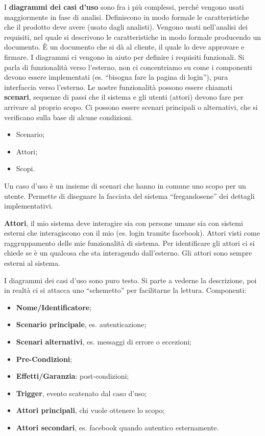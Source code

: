 I \textbf{diagrammi dei casi d'uso} sono fra i più complessi, perché vengono usati maggiormente in fase di analisi. Definiscono in modo formale le caratteristiche che il prodotto deve avere (usato dagli analisti). Vengono usati nell'analisi dei requisiti, nel quale si descrivono le caratteristiche in modo formale producendo un documento. È un documento che si dà al cliente, il quale lo deve approvare e firmare. I diagrammi ci vengono in aiuto per definire i requisiti funzionali. Si parla di funzionalità verso l'esterno, non ci concentriamo su come i componenti devono essere implementati (es. ``bisogna fare la pagina di login''), pura interfaccia verso l'esterno. Le nostre funzionalità possono essere chiamati \textbf{scenari}, sequenze di passi che il sistema e gli utenti (attori) devono fare per arrivare al proprio scopo. Ci possono essere scenari principali o alternativi, che si verificano sulla base di alcune condizioni.

\begin{itemize}
\item Scenario;
\item Attori;
\item Scopi.
\end{itemize}

Un caso d'uso è un insieme di scenari che hanno in comune uno scopo per un utente. Permette di disegnare la facciata del sistema ``fregandosene'' dei dettagli implementativi. 

\textbf{Attori}, il mio sistema deve interagire sia con persone umane sia con sistemi esterni che interagiscono con il mio (es. login tramite facebook). Attori visti come raggruppamento delle mie funzionalità di sistema. Per identificare gli attori ci si chiede se è un qualcosa che sta interagendo dall'esterno. Gli attori sono sempre esterni al sistema.

I diagrammi dei casi d'uso sono puro testo. Si parte a vederne la descrizione, poi in realtà ci si attacca uno ``schemetto'' per facilitarne la lettura. Componenti:

\begin{itemize}
\item \textbf{Nome/Identificatore};
\item \textbf{Scenario principale}, es. autenticazione;
\item \textbf{Scenari alternativi}, es. messaggi di errore o eccezioni;
\item \textbf{Pre-Condizioni};
\item \textbf{Effetti/Garanzia}: post-condizioni;
\item \textbf{Trigger}, evento scatenato dal caso d'uso;
\item \textbf{Attori principali}, chi vuole ottenere lo scopo;
\item \textbf{Attori secondari}, es. facebook quando autentico esternamente.
\end{itemize}

